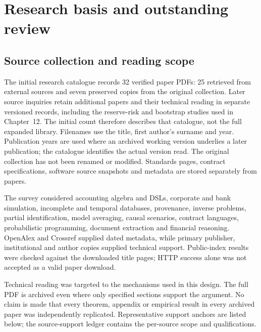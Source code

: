 \chapter{Research basis and outstanding review}
\label{app:research}

\section{Source collection and reading scope}

The initial research catalogue records 32 verified paper PDFs: 25 retrieved
from external sources and seven preserved copies from the original collection.
Later source inquiries retain additional papers and their technical reading
in separate versioned records, including the reserve-risk and bootstrap
studies used in Chapter~12. The initial count therefore describes that
catalogue, not the full expanded library.
Filenames use the title, first author's surname and year. Publication years
are used where an archived working version underlies a later publication;
the catalogue identifies the actual version read. The original collection
has not been renamed or modified. Standards pages, contract specifications,
software source snapshots and metadata are stored separately from papers.

The survey considered accounting algebra and DSLs, corporate and bank
simulation, incomplete and temporal databases, provenance, inverse problems,
partial identification, model averaging, causal scenarios, contract languages,
probabilistic programming, document extraction and financial reasoning.
OpenAlex and Crossref supplied dated metadata, while primary publisher,
institutional and author copies supplied technical support. Public-index
results were checked against the downloaded title pages; HTTP success alone
was not accepted as a valid paper download.

Technical reading was targeted to the mechanisms used in this design.
The full PDF is archived even where only specified sections support the
argument. No claim is made that every theorem, appendix or empirical result
in every archived paper was independently replicated. Representative support
anchors are listed below; the source-support ledger contains the per-source
scope and qualifications.


